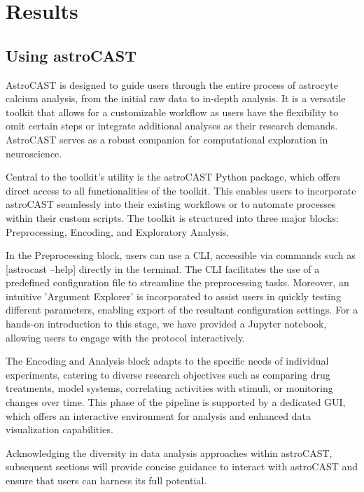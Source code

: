 \documentclass[utf8]{FrontiersinHarvard}
\newcommand{\inlineBash}[1]{%
    \begingroup
    \edef\temp{#1}%
    \expandafter\StrSubstitute\expandafter{\temp}{--}{-{-}}[\temp]%
    \tcbox[on line, boxsep=0pt, left=1pt, right=1pt, top=1pt, bottom=1pt,
        boxrule=0pt, arc=0pt, outer arc=0pt, colback=lightgray]{
        \texttt{\small \temp}
    }%
    \endgroup
}
\begin{document}
    \section{Results}

    \subsection{Using astroCAST}

    AstroCAST is designed to guide users through the entire process of astrocyte calcium analysis, from the initial raw data to in-depth analysis. It is a versatile toolkit that allows for a customizable workflow as users have the flexibility to omit certain steps or integrate additional analyses as their research demands. AstroCAST serves as a robust companion for computational exploration in neuroscience.

    Central to the toolkit's utility is the astroCAST Python package, which offers direct access to all functionalities of the toolkit. This enables users to incorporate astroCAST seamlessly into their existing workflows or to automate processes within their custom scripts. The toolkit is structured into three major blocks: Preprocessing, Encoding, and Exploratory Analysis.

    In the Preprocessing block, users can use a \ac{CLI}, accessible via commands such as \inlineBash{astrocast --help} directly in the terminal. The \ac{CLI} facilitates the use of a predefined configuration file to streamline the preprocessing tasks. Moreover, an intuitive 'Argument Explorer' is incorporated to assist users in quickly testing different parameters, enabling export of the resultant configuration settings. For a hands-on introduction to this stage, we have provided a Jupyter notebook, allowing users to engage with the protocol interactively.

    The Encoding and Analysis block adapts to the specific needs of individual experiments, catering to diverse research objectives such as comparing drug treatments, model systems, correlating activities with stimuli, or monitoring changes over time. This phase of the pipeline is supported by a dedicated \ac{GUI}, which offers an interactive environment for analysis and enhanced data visualization capabilities.

    Acknowledging the diversity in data analysis approaches within \ac{astroCAST}, subsequent sections will provide concise guidance to interact with astroCAST and ensure that users can harness its full potential.
\end{document}
